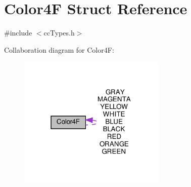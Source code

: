 \hypertarget{structColor4F}{}\section{Color4F Struct Reference}
\label{structColor4F}


{\ttfamily \#include $<$cc\+Types.\+h$>$}



Collaboration diagram for Color4F\+:
\nopagebreak
\begin{figure}[H]
\begin{center}
\leavevmode
\includegraphics[width=199pt]{structColor4F__coll__graph}
\end{center}
\end{figure}
